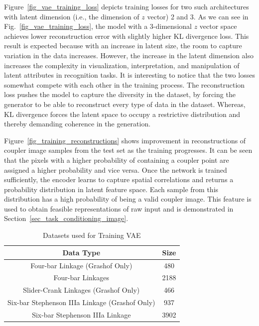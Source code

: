 Figure~\ref{fig_vae_training_loss} depicts training losses for two such architectures with latent dimension (i.e., the dimension of $z$ vector) 2 and 3.
As we can see in Fig.~\ref{fig_vae_training_loss}, the model with a 3-dimensional $z$ vector space achieves lower reconstruction error with slightly higher KL divergence loss.
This result is expected because with an increase in latent size, the room to capture variation in the data increases.
However, the increase in the latent dimension also increases the complexity in visualization, interpretation, and manipulation of latent attributes in recognition tasks.
It is interesting to notice that the two losses somewhat compete with each other in the training process.
The reconstruction loss pushes the model to capture the diversity in the dataset, by forcing the generator to be able to reconstruct every type of data in the dataset. Whereas, KL divergence forces the latent space to occupy a restrictive distribution and thereby demanding coherence in the generation.


Figure~\ref{fig_training_reconstructions} shows improvement in reconstructions of coupler image samples from the test set as the training progresses. It can be seen that the pixels with a higher probability of containing a coupler point are assigned a higher probability and vice versa. 
Once the network is trained sufficiently, the encoder learns to capture spatial correlations and returns a probability distribution in latent feature space. Each sample from this distribution has a high probability of being a valid coupler image. 
This feature is used to obtain feasible representations of raw input and is demonstrated in Section~\ref{sec_task_conditioning_image}. 


\begin{table}
  \caption{Datasets used for Training VAE}
\centering
\label{tab_dataset}
\begin{tabular}{cc}
\hline
  Data Type & Size \\
\hline
  Four-bar Linkage (Grashof Only) & 480 \\
  Four-bar Linkages & 2188 \\
  Slider-Crank Linkages (Grashof Only) & 466 \\
  Six-bar Stephenson IIIa Linkage (Grashof Only) & 937 \\
  Six-bar Stephenson IIIa Linkage & 3902 \\
\end{tabular}
\end{table}


